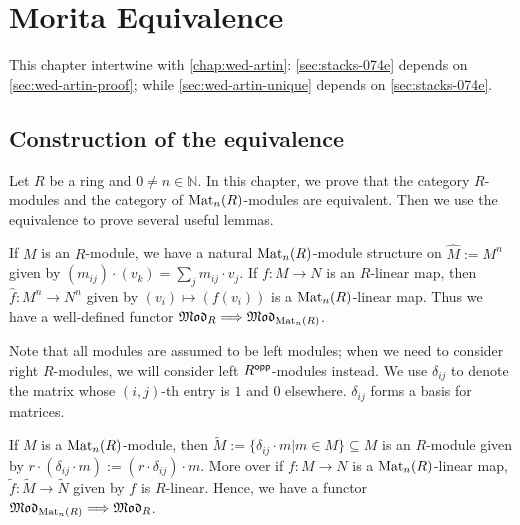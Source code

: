 \chapter{Morita Equivalence}\label{chap:morita}

This chapter intertwine with \cref{chap:wed-artin}: \cref{sec:stacks-074e} depends on \cref{sec:wed-artin-proof}; while \cref{sec:wed-artin-unique} depends on \cref{sec:stacks-074e}.

\section{Construction of the equivalence}\label{sec:morita-construction}

Let $R$ be a ring and $0 \ne n\in \mathbb{N}$. In this chapter, we prove that the category $R$-modules and the category of $\operatorname{Mat}_{n}(R)$-modules are equivalent. Then we use the equivalence to prove several useful lemmas.

\begin{construction}\label{con:morita-eqv-functor0}
  \leanok
  If $M$ is an $R$-module, we have a natural $\operatorname{Mat}_{n}(R)$-module structure on $\hat{M}:=M^{n}$ given by $(m_{ij})\cdot (v_{k})=\sum_{j}m_{ij}\cdot v_{j}$.
  If $f : M \to N$ is an $R$-linear map, then $\hat{f} : M^{n}\to N^{n}$ given by $(v_{i}) \mapsto (f(v_{i}))$ is a $\operatorname{Mat}_{n}(R)$-linear map. Thus we have a well-defined functor $\operatorname{\mathfrak{Mod}}_{R} \Longrightarrow \operatorname{\mathfrak{Mod}}_{\operatorname{Mat}_{n}(R)}$.
\end{construction}

\begin{remark}
Note that all modules are assumed to be left modules; when we need to consider right $R$-modules, we will consider left $R^{\mathsf{opp}}$-modules instead. We use $\delta_{ij}$ to denote the matrix whose $(i,j)$-th entry is $1$ and $0$ elsewhere. $\delta_{ij}$ forms a basis for matrices.
\end{remark}

\begin{construction}\label{con:morita-eqv-functor1}
  \leanok
  If $M$ is a $\operatorname{Mat}_{n}(R)$-module, then $\widetilde{M} := \{\delta_{ij}\cdot m | m \in M\} \subseteq M$ is an $R$-module given by $r \cdot (\delta_{ij}\cdot m) := (r\cdot \delta_{ij})\cdot m$. More over if $f : M \to N$ is a $\operatorname{Mat}_{n}(R)$-linear map, $\widetilde{f} : \widetilde{M} \to \widetilde{N}$ given by $f$ is $R$-linear. Hence, we have a functor $\operatorname{\mathfrak{Mod}}_{\operatorname{Mat}_{n}(R)}\Longrightarrow \operatorname{\mathfrak{Mod}}_{R}$.
\end{construction}

